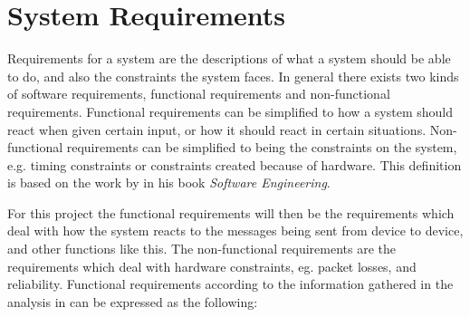 \section{System Requirements}\label{requirements}
Requirements for a system are the descriptions of what a system should be able to do, and also the constraints the system faces.
In general there exists two kinds of software requirements, functional requirements and non-functional requirements. 
Functional requirements can be simplified to how a system should react when given certain input, or how it should react in certain situations.
Non-functional requirements can be simplified to being the constraints on the system, e.g. timing constraints or constraints created because of hardware.
This definition is based on the work by \citet[see][chapter 4]{SEBook} in his book \textit{Software Engineering}. 

For this project the functional requirements will then be the requirements which deal with how the system reacts to the messages being sent from device to device, and other functions like this.
The non-functional requirements are the requirements which deal with hardware constraints, eg. packet losses, and reliability.
Functional requirements according to the information gathered in the analysis in  can be expressed as the following: 



